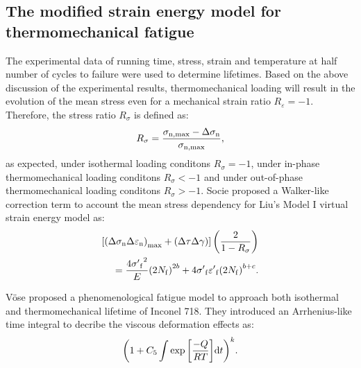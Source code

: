 \documentclass[preprint,5p,twocolumn,11pt,sort&compress]{elsarticle}
\begin{document}
\subsection{The modified strain energy model for thermomechanical fatigue}



The experimental data of running time, stress, strain and temperature at half number of cycles to failure were used to determine lifetimes.
Based on the above discussion of the experimental results, thermomechanical loading  will result in the evolution of the mean stress even for a mechanical strain ratio $R_{\varepsilon}=-1$. Therefore, the stress ratio ${R_\sigma }$ is defined as:
\begin{equation}
{R_\sigma } = \frac{{{\sigma _{\rm n,\max }} - \Delta {\sigma _{\rm n}}}}{{{\sigma _{\rm n,\max }}}},
\end{equation}
as expected, under isothermal loading conditons ${R_\sigma }=-1$, under in-phase thermomechanical loading conditons ${R_\sigma }<-1$ and under out-of-phase thermomechanical loading conditons ${R_\sigma }>-1$.
Socie \cite{Socie2000} proposed a Walker-like correction term \cite{Walker1970} to account the mean stress dependency for Liu's Model I virtual strain energy model as:
\begin{equation}
\begin{aligned}
\left[ {{{\left( {\Delta {\sigma _{\rm n}}\Delta {\varepsilon _{\rm n}}} \right)}_{\max }} + \left( {\Delta \tau \Delta \gamma } \right)} \right]\left( {\frac{2}{{1 - {R_\sigma }}}} \right)\\
= \frac{{4{{\sigma '}_{\rm f}}^2}}{E}{\left( {2{N_{\rm f}}} \right)^{2b}} + 4{{\sigma '}_{\rm f}}{{\varepsilon '}_{\rm f}}{\left( {2{N_{\rm f}}} \right)^{b + c}}.
\end{aligned}
\label{Equ:StudyModel}
\end{equation}

V\"{o}se \cite{Vose2013} proposed a phenomenological fatigue model to approach both isothermal and thermomechanical lifetime of Inconel 718. They introduced an Arrhenius-like time integral to decribe the viscous deformation effects as:
\begin{equation}
{\left( {1 + {C_5}\int {\exp \left[ {\frac{{ - Q}}{{RT}}} \right]} {\rm{d}}t} \right)^k}.
\end{equation}
\end{document}
